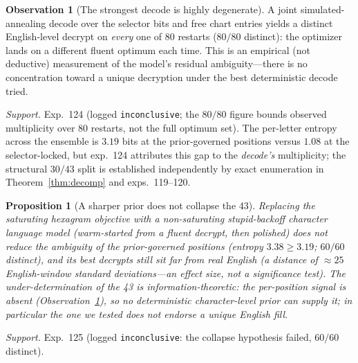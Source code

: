 \documentclass[11pt]{article}
\theoremstyle{plain}
\newtheorem{proposition}{Proposition}
\theoremstyle{definition}
\newtheorem{observation}{Observation}
\begin{document}
\begin{observation}[The strongest decode is highly degenerate]\label{obs:degenerate}
A joint simulated-annealing decode over the selector bits and free chart entries
yields a distinct English-level decrypt on \emph{every} one of $80$ restarts ($80/80$
distinct): the optimizer lands on a different fluent optimum each time. This is an
empirical (not deductive) measurement of the model's residual ambiguity---there is no
concentration toward a unique decryption under the best deterministic decode tried.
\end{observation}
\noindent\emph{Support.} Exp.~124 (logged \texttt{inconclusive}; the $80/80$ figure
bounds observed multiplicity over $80$ restarts, not the full optimum set). The
per-letter entropy across the ensemble is $3.19$ bits at the prior-governed positions
versus $1.08$ at the selector-locked, but exp.~124 attributes this gap to the
\emph{decode's} multiplicity; the structural $30/43$ split is established
independently by exact enumeration in Theorem~\ref{thm:decomp} and exps.~119--120.

\begin{proposition}[A sharper prior does not collapse the 43]\label{prop:prior}
Replacing the saturating hexagram objective with a non-saturating stupid-backoff
character language model (warm-started from a fluent decrypt, then polished) does not
reduce the ambiguity of the prior-governed positions (entropy $3.38\ge3.19$;
$60/60$ distinct), and its best decrypts still sit far from real English (a distance
of $\approx25$ English-window standard deviations---an effect size, not a significance
test). The under-determination of the 43 is information-theoretic: the per-position
signal is absent (Observation~\ref{obs:degenerate}), so no deterministic
character-level prior can supply it; in particular the one we tested does not endorse
a unique English fill.
\end{proposition}
\noindent\emph{Support.} Exp.~125 (logged \texttt{inconclusive}: the collapse
hypothesis failed, $60/60$ distinct).
\end{document}

